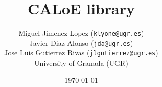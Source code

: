 \title{ \LARGE \textbf{CALoE library}}
\author{Miguel Jimenez Lopez (\texttt{klyone@ugr.es}) \\
Javier Diaz Alonso (\texttt{jda@ugr.es}) \\
Jose Luis Gutierrez Rivas (\texttt{jlgutierrez@ugr.es}) \\
University of Granada (UGR)}
\date{\today}

\maketitle
